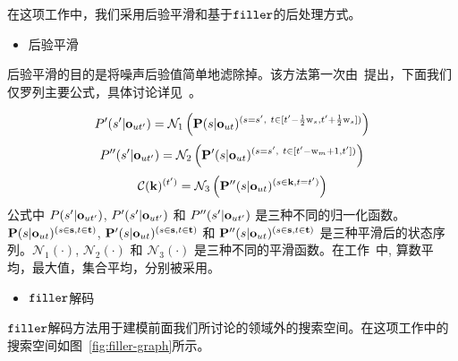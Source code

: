 在这项工作中，我们采用后验平滑和基于$\tt filler$的后处理方式。

\begin{itemize}
  \item 后验平滑
\end{itemize}
后验平滑的目的是将噪声后验值简单地滤除掉。该方法第一次由~\cite{chen2014small}提出，下面我们仅罗列主要公式，具体讨论详见~\cite{chen2018kws}。

\begin{equation}
\label{equ:post-smooth-conf}
\begin{split}
P'(s'|{\bf o}_{ut'})=\mathcal{N}_1\left (\mathbf{P}(s|{\bf o}_{ut})^{(s=s',\ t\in [t'-\frac{1}{2}\mathrm w_{s},t'+\frac{1}{2}\mathrm w_{s}])}\right ) 
\end{split}
\end{equation}
\begin{equation}
\label{equ:post-smooth-conf2}
\begin{split}
P''(s'|{\bf o}_{ut'})=\mathcal{N}_2\left (\mathbf{P}'(s|{\bf o}_{ut})^{(s=s',\ t\in [t'-\mathrm w_{m}+1,t'])}\right ) 
\end{split}
\end{equation}
\begin{equation}
\label{equ:post-smooth-conf3}
\begin{split}
\mathcal C(\mathbf{k})^{(t')}=\mathcal{N}_3\left (\mathbf{P}''(s|{\bf o}_{ut})^{(s\in \mathbf{k},t=t')}\right ) 
\end{split}
\end{equation}
公式中 $P(s'|{\bf o}_{ut'})$, $P'(s'|{\bf o}_{ut'})$ 和 $P''(s'|{\bf o}_{ut'})$ 是三种不同的归一化函数。  $\mathbf{P}(s|{\bf o}_{ut})^{(s\in \mathbf{s},t\in\mathbf{t})}$, $\mathbf{P}'(s|{\bf o}_{ut})^{(s\in \mathbf{s},t\in\mathbf{t})}$ 和 $\mathbf{P}''(s|{\bf o}_{ut})^{(s\in \mathbf{s},t\in\mathbf{t})}$ 是三种平滑后的状态序列。$\mathcal{N}_1(\cdot)$, $\mathcal{N}_2(\cdot)$ 和 $\mathcal{N}_3(\cdot)$ 是三种不同的平滑函数。在工作~\cite{chen2014small}中,  算数平均，最大值，集合平均，分别被采用。

\begin{itemize}
  \item {$\tt filler$解码}
\end{itemize}

$\tt filler$解码方法用于建模前面我们所讨论的领域外的搜索空间。在这项工作中的搜索空间如图~\ref{fig:filler-graph}所示。

